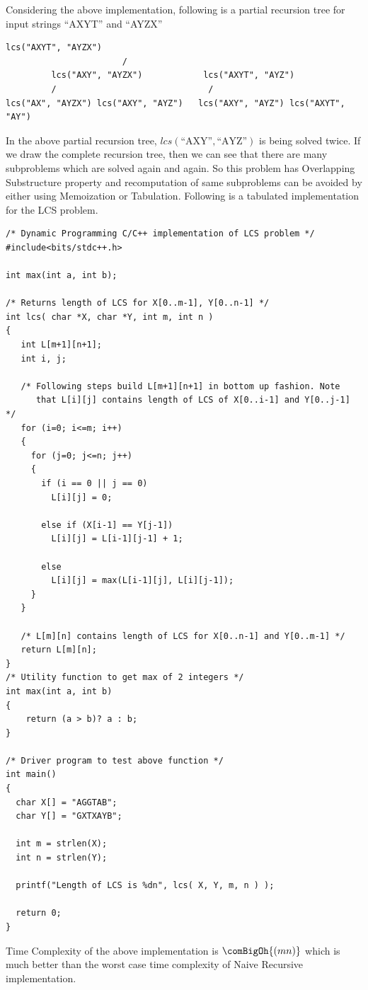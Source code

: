 Considering the above implementation, following is a partial recursion tree
for input strings ``AXYT'' and ``AYZX''
\begin{lstlisting}[style=pseudostyle]
                         lcs("AXYT", "AYZX")
                       /                 
         lcs("AXY", "AYZX")            lcs("AXYT", "AYZ")
         /                              /               
lcs("AX", "AYZX") lcs("AXY", "AYZ")   lcs("AXY", "AYZ") lcs("AXYT", "AY")
\end{lstlisting}
In the above partial recursion tree, $lcs(\text{``AXY''},\text{``AYZ''})$ is
being solved twice. If we draw the complete recursion tree, then we can see
that there are many subproblems which are solved again and again. So this
problem has Overlapping Substructure property and recomputation of same
subproblems can be avoided by either using Memoization or Tabulation.
Following is a tabulated implementation for the LCS problem.
\begin{lstlisting}[style=raycppnewsnippet]
/* Dynamic Programming C/C++ implementation of LCS problem */
#include<bits/stdc++.h>
  
int max(int a, int b);
  
/* Returns length of LCS for X[0..m-1], Y[0..n-1] */
int lcs( char *X, char *Y, int m, int n )
{
   int L[m+1][n+1];
   int i, j;
  
   /* Following steps build L[m+1][n+1] in bottom up fashion. Note 
      that L[i][j] contains length of LCS of X[0..i-1] and Y[0..j-1] */
   for (i=0; i<=m; i++)
   {
     for (j=0; j<=n; j++)
     {
       if (i == 0 || j == 0)
         L[i][j] = 0;
  
       else if (X[i-1] == Y[j-1])
         L[i][j] = L[i-1][j-1] + 1;
  
       else
         L[i][j] = max(L[i-1][j], L[i][j-1]);
     }
   }
    
   /* L[m][n] contains length of LCS for X[0..n-1] and Y[0..m-1] */
   return L[m][n];
}
/* Utility function to get max of 2 integers */
int max(int a, int b)
{
    return (a > b)? a : b;
}
  
/* Driver program to test above function */
int main()
{
  char X[] = "AGGTAB";
  char Y[] = "GXTXAYB";
  
  int m = strlen(X);
  int n = strlen(Y);
  
  printf("Length of LCS is %dn", lcs( X, Y, m, n ) );
 
  return 0;
}
\end{lstlisting}
Time Complexity of the above implementation is $\comBigOh{(mn)}$ which is
much better than the worst case time complexity of Naive Recursive
implementation.

